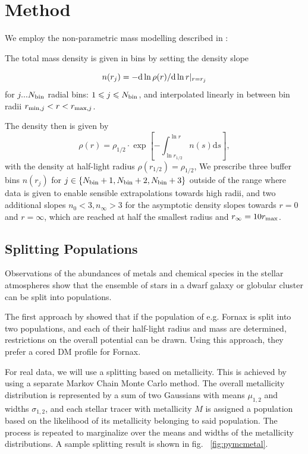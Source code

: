 \section{Method}\label{sec:method}
We employ the non-parametric mass modelling described in
\citep{Steger+2014}:

The total mass density is given in bins by setting the density slope

\begin{equation}
n(r_j)=-{\rm d}\ln\rho(r)/{\rm d}\ln r|_{r=r_j}
\end{equation}
for $j ... N_{\rm bin}$ radial bins: $1\leq j\leq N_{\rm bin}$, and
interpolated linearly in between bin radii $r_{{\rm min},j}<r<r_{{\rm
    max},j}$.

The density then is given by
\begin{equation*}
    \rho(r) = \rho_{1/2}\cdot\exp\left[-\int_{\ln r_{1/2}}^{\ln r}n(s)\text{d}s\right],
\end{equation*}
with the density at half-light radius $\rho(r_{1/2})=\rho_{1/2}$, We
prescribe three buffer bins $n(r_j)$ for $j\in\{N_{\rm bin}+1,
N_{\rm bin}+2, N_{\rm bin}+3\}$ outside of the range where data is given to
enable sensible extrapolations towards high radii, and two additional slopes
$n_0 < 3, n_\infty>3$ for the asymptotic density slopes towards $r=0$ and
$r=\infty$, which are reached at half the smallest radius and $r_\infty=10r_{\rm
  max}$.


\subsection{Splitting Populations}\label{sec:metals}
Observations of the abundances of metals and chemical species in the
stellar atmospheres show that the ensemble of stars in a dwarf galaxy
or globular cluster can be split into populations.

The first approach by \cite{WalkerPenarrubia2011} showed that if the
population of e.g. Fornax is split into two populations, and each of
their half-light radius and mass are determined, restrictions on the
overall potential can be drawn. Using this approach, they prefer a
cored DM profile for Fornax.

For real data, we will use a splitting based on metallicity. This is
achieved by using a separate Markov Chain Monte Carlo method. The
overall metallicity distribution is represented by a sum of two
Gaussians with means $\mu_{1,2}$ and widths $\sigma_{1,2}$, and each
stellar tracer with metallicity $M$ is assigned a population based on
the likelihood of its metallicity belonging to said population. The
process is repeated to marginalize over the means and widths of the
metallicity distributions. A sample splitting result is shown in
fig. ~\ref{fig:pymcmetal}.

